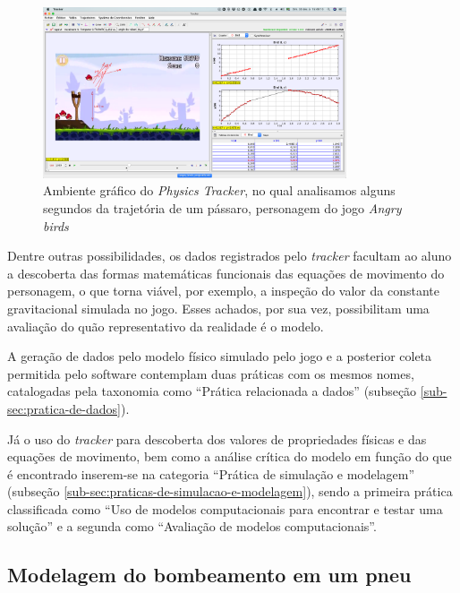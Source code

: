 \begin{figure}[!htb]
  \caption{Ambiente gráfico do \textit{Physics Tracker}, no qual analisamos alguns segundos da trajetória de um pássaro, personagem do jogo \textit{Angry birds}}
  \begin{center}
    \includegraphics[width=0.8\textwidth]{imagens/physics-tracker}
  \end{center}
  \label{fig:physics-tracker}
\end{figure}

Dentre outras possibilidades, os dados registrados pelo \textit{tracker} facultam ao aluno a descoberta das formas matemáticas funcionais das equações de movimento do personagem, o que torna viável, por exemplo, a inspeção do valor da constante gravitacional simulada no jogo. Esses achados, por sua vez, possibilitam uma avaliação do quão representativo da realidade é o modelo. 

A geração de dados pelo modelo físico simulado pelo jogo e a posterior coleta permitida pelo software contemplam duas práticas com os mesmos nomes, catalogadas pela taxonomia como ``Prática relacionada a dados'' (subseção \ref{sub-sec:pratica-de-dados}). 

Já o uso do \textit{tracker} para descoberta dos valores de propriedades físicas e das equações de movimento, bem como a análise crítica do modelo em função do que é encontrado inserem-se na categoria ``Prática de simulação e modelagem'' (subseção \ref{sub-sec:praticas-de-simulacao-e-modelagem}), sendo a primeira prática classificada como ``Uso de modelos computacionais para encontrar e testar uma solução''  e a segunda como ``Avaliação de modelos computacionais''.    

\subsection{Modelagem do bombeamento em um pneu}

